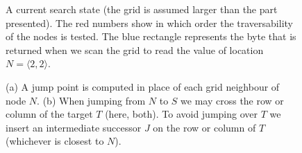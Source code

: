 \begin{figure}[tb]
  \caption{\small 
A current search state (the grid is assumed larger than the part presented).
The red numbers show in which order the traversability of the nodes is tested.
The blue rectangle represents the byte that is returned when we scan the
grid to read the value of location $N = \langle 2, 2\rangle$.
}
  \label{fig::gridforblocks}
\end{figure}

\begin{figure}[tb]
       \begin{center}
         \scalebox{.8}{}
       \end{center}
       \caption{\small (a) A jump point is computed in place of each grid neighbour of node $N$.
		(b) When jumping from $N$ to $S$ we may cross the row or column of the target $T$ (here, both). 
To avoid jumping over $T$ we insert an intermediate successor $J$ on the row or column of $T$ (whichever is closest to $N$).}
       \label{fig:preproc}
\end{figure}
